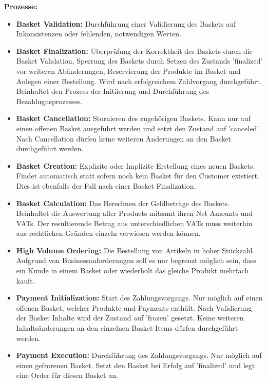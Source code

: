 {\large \textbf{Prozesse:}}
\begin{itemize}[noitemsep,nolistsep]
	\item \textbf{Basket Validation: } {Durchführung einer Validierung des Baskets auf Inkonsistenzen oder fehlenden, notwendigen Werten.}
	\item \textbf{Basket Finalization: } {Überprüfung der Korrektheit des Baskets durch die Basket Validation, Sperrung des Baskets durch Setzen des Zustands 'finalized' vor weiteren Abänderungen, Reservierung der Produkte im Basket und Anlegen einer Bestellung. Wird nach erfolgreichem Zahlvorgang durchgeführt. Beinhaltet den Prozess der Initiierung und Durchführung des Bezahlugnsprozesses.}
	\item \textbf{Basket Cancellation: } {Stornieren des zugehörigen Baskets. Kann nur auf einen offenen Basket ausgeführt werden und setzt den Zustand auf 'canceled'. Nach Cancellation dürfen keine weiteren Änderungen an den Basket durchgeführt werden. }
	\item \textbf{Basket Creation: } {Explizite oder Implizite Erstellung eines neuen Baskets. Findet automatisch statt sofern noch kein Basket für den Customer existiert. Dies ist ebenfalls der Fall nach einer Basket Finalization.}
	\item \textbf{Basket Calculation: } {Das Berechnen der Geldbeträge des Baskets. Beinhaltet die Auswertung aller Products mitsamt ihren Net Amounts und VATs. Der resultierende Betrag aus unterschiedlichen VATs muss weiterhin aus rechtlichen Gründen einzeln verwiesen werden können.}
	\item \textbf{High Volume Ordering: } {Die Bestellung von Artikeln in hoher Stückzahl. Aufgrund von Businessanforderungen soll es nur begrenzt möglich sein, dass ein Kunde in einem Basket oder wiederholt das gleiche Produkt mehrfach kauft.}
	\item \textbf{Payment Initialization: } {Start des Zahlungsvorgangs. Nur möglich auf einen offenen Basket, welcher Produkte und Payments enthält. Nach Validierung der Basket Inhalte wird der Zustand auf 'frozen' gesetzt. Keine weiteren Inhaltsänderungen an den einzelnen Basket Items dürfen durchgeführt werden.}
	\item \textbf{Payment Execution: } {Durchführung des Zahlungsvorgangs. Nur möglich auf einen gefrorenen Basket. Setzt den Basket bei Erfolg auf 'finalized' und legt eine Order für diesen Basket an.}
\end{itemize}
\vspace{0.4em}

